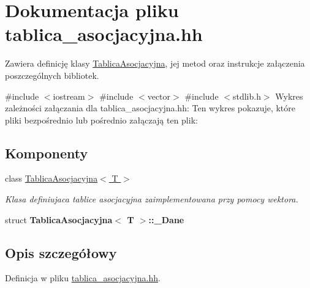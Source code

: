 \hypertarget{tablica__asocjacyjna_8hh}{\section{\-Dokumentacja pliku tablica\-\_\-asocjacyjna.\-hh}
\label{tablica__asocjacyjna_8hh}
}


\-Zawiera definicję klasy \hyperlink{class_tablica_asocjacyjna}{\-Tablica\-Asocjacyjna}, jej metod oraz instrukcje załączenia poszczególnych bibliotek.  


{\ttfamily \#include $<$iostream$>$}\*
{\ttfamily \#include $<$vector$>$}\*
{\ttfamily \#include $<$stdlib.\-h$>$}\*
\-Wykres zależności załączania dla tablica\-\_\-asocjacyjna.\-hh\-:
\-Ten wykres pokazuje, które pliki bezpośrednio lub pośrednio załączają ten plik\-:
\subsection*{\-Komponenty}
\begin{DoxyCompactItemize}
\item 
class \hyperlink{class_tablica_asocjacyjna}{\-Tablica\-Asocjacyjna$<$ T $>$}
\begin{DoxyCompactList}\small\item\em \-Klasa definiujaca tablice asocjacyjna zaimplementowana przy pomocy wektora. \end{DoxyCompactList}\item 
struct {\bfseries \-Tablica\-Asocjacyjna$<$ T $>$\-::\-\_\-\-Dane}
\end{DoxyCompactItemize}


\subsection{\-Opis szczegółowy}


\-Definicja w pliku \hyperlink{tablica__asocjacyjna_8hh_source}{tablica\-\_\-asocjacyjna.\-hh}.

